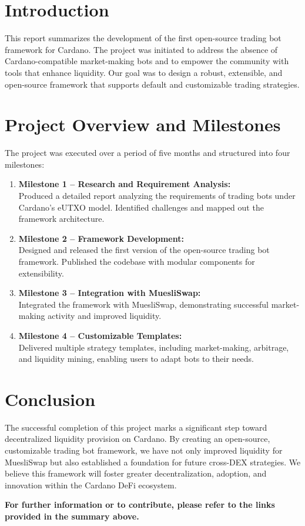 \documentclass[11pt]{article}
\begin{document}
\section{Introduction}
This report summarizes the development of the first open-source trading bot framework for Cardano. The project was initiated to address the absence of Cardano-compatible market-making bots and to empower the community with tools that enhance liquidity. Our goal was to design a robust, extensible, and open-source framework that supports default and customizable trading strategies.

\section{Project Overview and Milestones}
The project was executed over a period of five months and structured into four milestones:
\begin{enumerate}
    \item \textbf{Milestone 1 – Research and Requirement Analysis:}\\
    Produced a detailed report analyzing the requirements of trading bots under Cardano’s eUTXO model. Identified challenges and mapped out the framework architecture.

    \item \textbf{Milestone 2 – Framework Development:}\\
    Designed and released the first version of the open-source trading bot framework. Published the codebase with modular components for extensibility.

    \item \textbf{Milestone 3 – Integration with MuesliSwap:}\\
    Integrated the framework with MuesliSwap, demonstrating successful market-making activity and improved liquidity.

    \item \textbf{Milestone 4 – Customizable Templates:}\\
    Delivered multiple strategy templates, including market-making, arbitrage, and liquidity mining, enabling users to adapt bots to their needs.
\end{enumerate}

\section{Conclusion}
The successful completion of this project marks a significant step toward decentralized liquidity provision on Cardano. By creating an open-source, customizable trading bot framework, we have not only improved liquidity for MuesliSwap but also established a foundation for future cross-DEX strategies. We believe this framework will foster greater decentralization, adoption, and innovation within the Cardano DeFi ecosystem.

\bigskip

\noindent \textbf{For further information or to contribute, please refer to the links provided in the summary above.}
\end{document}
